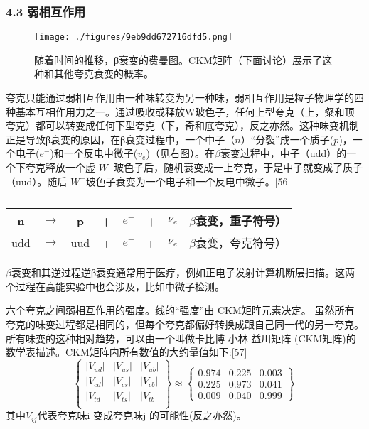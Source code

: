\subsubsection{4.3 弱相互作用}
\begin{figure}[ht]
\centering
\texttt{[image: ./figures/9eb9dd672716dfd5.png]}
\caption{随着时间的推移，β衰变的费曼图。CKM矩阵（下面讨论）展示了这种和其他夸克衰变的概率。} \label{fig_Quark_5}
\end{figure}
夸克只能通过弱相互作用由一种味转变为另一种味，弱相互作用是粒子物理学的四种基本互相作用力之一。通过吸收或释放W玻色子，任何上型夸克（上，粲和顶夸克）都可以转变成任何下型夸克（下，奇和底夸克），反之亦然。这种味变机制正是导致β衰变的原因，在β衰变过程中，一个中子（$n$）“分裂”成一个质子($p$)，一个电子($e^{-}$)和一个反电中微子($v_e$)（见右图）。在$\beta$衰变过程中，中子（udd）的一个下夸克释放一个虚 $W^{-}$玻色子后，随机衰变成一上夸克，于是中子就变成了质子（uud）。随后 $W^{-}$玻色子衰变为一个电子和一个反电中微子。[56]
\begin{table}[ht]
\centering
\caption\label{Quark}
\begin{tabular}{|c|c|c|c}
\hline
n & $\rightarrow$ & p & + & $e^{-}$ & + &  $\nu_{e}$ & $\beta$衰变，重子符号） \\
\hline
udd & $\rightarrow$ & uud & + & $e^{-}$ & + & $\nu_{e}$ &$\beta$衰变，夸克符号） \\
\hline
\end{tabular}
\end{table}
$\beta$衰变和其逆过程逆β衰变通常用于医疗，例如正电子发射计算机断层扫描。这两个过程在高能实验中也会涉及，比如中微子检测。

六个夸克之间弱相互作用的强度。线的“强度”由 CKM矩阵元素决定。
虽然所有夸克的味变过程都是相同的，但每个夸克都偏好转换成跟自己同一代的另一夸克。所有味变的这种相对趋势，可以由一个叫做卡比博-小林-益川矩阵 (CKM矩阵)的数学表描述。CKM矩阵内所有数值的大约量值如下:[57]
\begin{equation}
\begin{Bmatrix}
|V_{ud}| & |V_{us}|& |V_{ub}| \\
|V_{cd}| & |V_{cs}| & |V_{cb}| \\
|V_{td}| & |V_{ts}| & |V_{tb}| \\
\end{Bmatrix}
\approx
\begin{Bmatrix}
0.974 & 0.225 & 0.003 \\
0.225 & 0.973 & 0.041 \\
0.009 & 0.040 & 0.999
\end{Bmatrix}~
\end{equation}
其中$V_{ij}$代表夸克味i 变成夸克味j 的可能性(反之亦然)。

